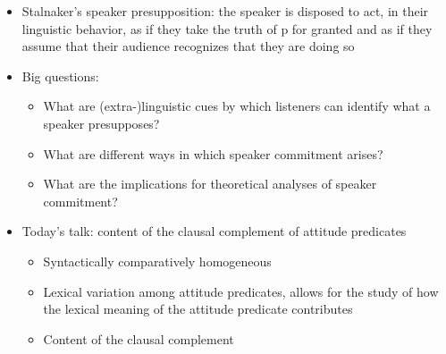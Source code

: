 \documentclass[11pt,fleqn]{article}
\newcommand{\6}{\mbox{$[\hspace*{-.6mm}[$}}
\newcommand{\9}{\mbox{$]\hspace*{-.6mm}]$}}
\begin{document}
\begin{itemize}[leftmargin=5ex,topsep=0pt,itemsep=-2pt]
\item Stalnaker's speaker presupposition: the speaker is disposed to act, in their linguistic behavior, as if they take the truth of p for granted and as if they assume that their audience recognizes that they are doing so

\item Big questions: 

\begin{itemize}[leftmargin=5ex,topsep=0pt,itemsep=-2pt]

\item What are (extra-)linguistic cues by which listeners can identify what a speaker presupposes? 

\item What are different ways in which speaker commitment arises? 

\item What are the implications for theoretical analyses of speaker commitment?

\end{itemize}


\item Today's talk: content of the clausal complement of attitude predicates

\begin{itemize}[leftmargin=5ex,topsep=0pt,itemsep=-2pt]

\item Syntactically comparatively homogeneous

\item Lexical variation among attitude predicates, allows for the study of how the lexical meaning of the attitude predicate contributes

\item Content of the clausal complement 

\end{itemize}

\end{itemize}

\newpage
\end{document}
